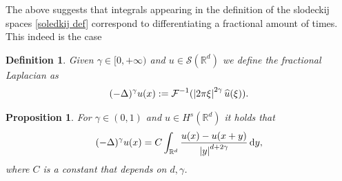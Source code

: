 \documentclass[
    a4paper,
    DIV=14,
    abstract=true,
    numbers=noenddot
]
{scrartcl}
\newtheorem{proposition}[theorem]{Proposition}
\newtheorem{definition}[theorem]{Definition}
\theoremstyle{definition}
\newcommand{\wh}[1]{\widehat{#1}}
\renewcommand{\d}{\,\mathrm{d}}\newcommand{\dx}{\,\mathrm{d}x}
\newcommand{\R}{\mathbb{R}}
\newcommand{\Ss}{\mathcal{S}}
\begin{document}
The above suggests that integrals appearing in the definition of the slodeckij spaces \ref{soledkij def} correspond to differentiating a fractional amount of times. This indeed is the case
\begin{definition}
    Given $\gamma  \in [0,+\infty)$ and $u \in \Ss (\R^d)$ we define the fractional Laplacian as
    \begin{align*}
        (-\Delta )^{\gamma }u(x):= \mathcal{F}^{-1}(\abs{2\pi\xi}^{2\gamma }\wh{u}(\xi )).
    \end{align*}
\end{definition}
\begin{proposition}
    For $\gamma  \in (0,1)$ and $u \in H^{s}(\R^d)$ it holds that
    \begin{align*}
        (-\Delta )^{\gamma }u(x)=C\int_{\R^d}\frac{u(x)-u(x+y)}{\abs{y}^{d+2\gamma}}\d y,
    \end{align*}
    where $C$ is a constant that depends on $d,\gamma $.
\end{proposition}
\end{document}
